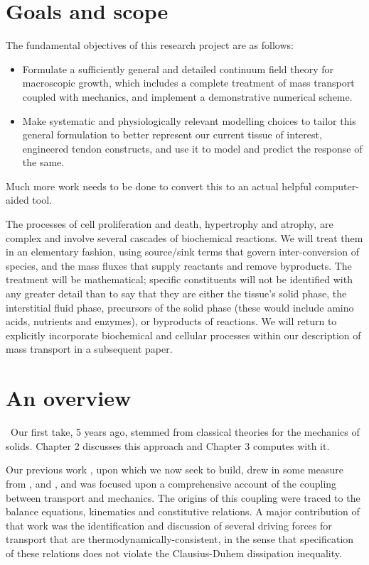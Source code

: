 \section{Goals and scope}
\label{goals}

The fundamental objectives of this research project are as follows:

\begin{itemize}
\item Formulate a sufficiently general and detailed continuum field
  theory for macroscopic growth, which includes a complete treatment
  of mass transport coupled with mechanics, and implement a
  demonstrative numerical scheme.
\item Make systematic and physiologically relevant modelling choices
  to tailor this general formulation to better represent our current
  tissue of interest, engineered tendon constructs, and use it to
  model and predict the response of the same.
\end{itemize}

Much more work needs to be done to convert this to an actual
helpful computer-aided tool.

The processes of cell proliferation and death, hypertrophy and
atrophy, are complex and involve several cascades of biochemical
reactions. We will treat them in an elementary fashion, using
source/sink terms that govern inter-conversion of species, and the
mass fluxes that supply reactants and remove byproducts. The
treatment will be mathematical; specific constituents will not be
identified with any greater detail than to say that they are
either the tissue's solid phase, the interstitial fluid phase,
precursors of the solid phase (these would include amino acids,
nutrients and enzymes), or byproducts of reactions. We will return
to explicitly incorporate biochemical and cellular processes
within our description of mass transport in a subsequent paper.

\section{An overview}
\label{overview}

\textbullet\ Our first take, 5 years ago, stemmed from classical theories for
the mechanics of solids. Chapter 2 discusses this approach and Chapter
3 computes with it.

 Our previous work
\citep{growthpaper}, upon which we now seek to build, drew in some
measure from \citet{CowinHegedus:76, EpsteinMaugin:2000}, and
\citet{TaberHumphrey:2001}, and was focused upon a comprehensive
account of the coupling between transport and mechanics. The origins
of this coupling were traced to the balance equations, kinematics and
constitutive relations. A major contribution of that work was the
identification and discussion of several driving forces for transport
that are thermodynamically-consistent, in the sense that specification
of these relations does not violate the Clausius-Duhem dissipation
inequality. 

